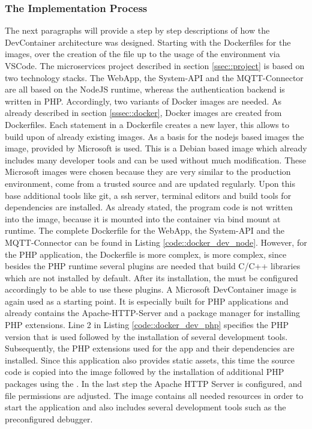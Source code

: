         \subsubsection{The Implementation Process}\label{ssec::imp_process}
        The next paragraphs will provide a step by step descriptions of how the DevContainer architecture was designed. Starting with the Dockerfiles for the images, over the creation of the  file up to the usage of the environment via \ac{VSCode}.
        The microservices project described in section \ref{ssec::project} is based on two technology stacks. The WebApp, the System-API and the MQTT-Connector are all based on the NodeJS runtime, whereas the authentication backend is written in PHP. Accordingly, two variants of Docker images are needed. As already described in section \ref{sssec::docker}, Docker images are created from Dockerfiles. Each statement in a Dockerfile creates a new layer, this allows to build upon of already existing images.\newline
        As a basis for the nodejs based images the  image, provided by Microsoft is used. This is a Debian based image which already includes many developer tools and can be used without much modification. These Microsoft images were chosen because they are very similar to the production environment, come from a trusted source and are updated regularly. Upon this base additional tools like git, a ssh server, terminal editors  and build tools for dependencies are installed. As already stated, the program code is not written into the image, because it is mounted into the container via bind mount at runtime. The complete Dockerfile for the WebApp, the System-\ac{API} and the MQTT-Connector can be found in Listing \ref{code::docker_dev_node}.\newline
        However, for the PHP application, the Dockerfile is more complex, is more complex, since besides the PHP runtime several plugins are needed that build C/C++ libraries which are not installed by default. After its installation, the  must be configured accordingly to be able to use these plugins. A Microsoft DevContainer image is again used as a starting point. It is especially built for PHP applications and already contains the Apache-\acs{HTTP}-Server and a package manager for installing PHP extensions. Line 2 in Listing \ref{code::docker_dev_php} specifies the PHP version that is used followed by the installation of several development tools. Subsequently, the PHP extensions used for the app and their dependencies are installed. Since this application also provides static assets, this time the source code is copied into the image followed by the installation of additional PHP packages using the . In the last step the Apache \acs{HTTP} Server is configured, and file permissions are adjusted. The image contains all needed resources in order to start the application and also includes several development tools such as the preconfigured  debugger.\newline
